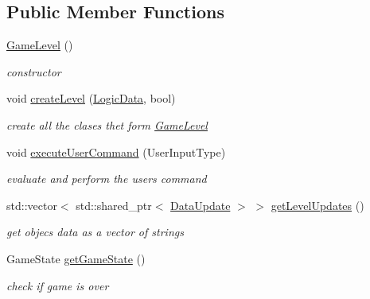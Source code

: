 \subsection*{Public Member Functions}
\begin{DoxyCompactItemize}
\item 
\mbox{\label{class_game_level_a5723a38b2b32300d4f071419afacd6f9}} 
\mbox{\hyperlink{class_game_level_a5723a38b2b32300d4f071419afacd6f9}{Game\+Level}} ()
\begin{DoxyCompactList}\small\item\em constructor \end{DoxyCompactList}\item 
\mbox{\label{class_game_level_acbabd989c2876a2326e6b69e33e75fa1}} 
void \mbox{\hyperlink{class_game_level_acbabd989c2876a2326e6b69e33e75fa1}{create\+Level}} (\mbox{\hyperlink{class_logic_data}{Logic\+Data}}, bool)
\begin{DoxyCompactList}\small\item\em create all the clases thet form \mbox{\hyperlink{class_game_level}{Game\+Level}} \end{DoxyCompactList}\item 
void \mbox{\hyperlink{class_game_level_a53cd899aa9aeaf3e9579ff32598b0043}{execute\+User\+Command}} (User\+Input\+Type)
\begin{DoxyCompactList}\small\item\em evaluate and perform the user\textquotesingle{}s command \end{DoxyCompactList}\item 
\mbox{\label{class_game_level_a89ddaa1423d19132e8d4c97b36f92895}} 
std\+::vector$<$ std\+::shared\+\_\+ptr$<$ \mbox{\hyperlink{class_data_update}{Data\+Update}} $>$ $>$ \mbox{\hyperlink{class_game_level_a89ddaa1423d19132e8d4c97b36f92895}{get\+Level\+Updates}} ()
\begin{DoxyCompactList}\small\item\em get objec\textquotesingle{}s data as a vector of strings \end{DoxyCompactList}\item 
\mbox{\label{class_game_level_a907f82fea7462dbaf47c396cf65e2e89}} 
Game\+State \mbox{\hyperlink{class_game_level_a907f82fea7462dbaf47c396cf65e2e89}{get\+Game\+State}} ()
\begin{DoxyCompactList}\small\item\em check if game is over \end{DoxyCompactList}\end{DoxyCompactItemize}


